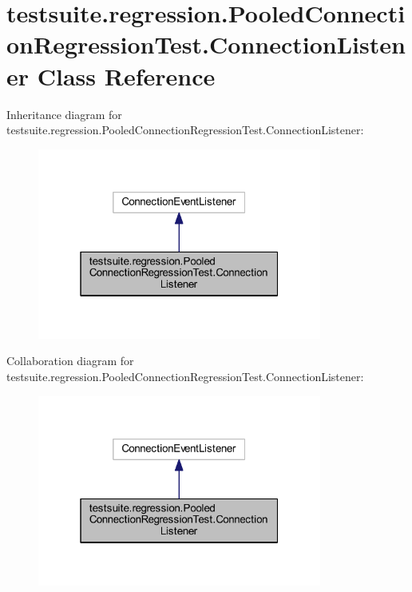 \hypertarget{classtestsuite_1_1regression_1_1_pooled_connection_regression_test_1_1_connection_listener}{}\section{testsuite.\+regression.\+Pooled\+Connection\+Regression\+Test.\+Connection\+Listener Class Reference}
\label{classtestsuite_1_1regression_1_1_pooled_connection_regression_test_1_1_connection_listener}


Inheritance diagram for testsuite.\+regression.\+Pooled\+Connection\+Regression\+Test.\+Connection\+Listener\+:
\nopagebreak
\begin{figure}[H]
\begin{center}
\leavevmode
\includegraphics[width=265pt]{classtestsuite_1_1regression_1_1_pooled_connection_regression_test_1_1_connection_listener__inherit__graph}
\end{center}
\end{figure}


Collaboration diagram for testsuite.\+regression.\+Pooled\+Connection\+Regression\+Test.\+Connection\+Listener\+:
\nopagebreak
\begin{figure}[H]
\begin{center}
\leavevmode
\includegraphics[width=265pt]{classtestsuite_1_1regression_1_1_pooled_connection_regression_test_1_1_connection_listener__coll__graph}
\end{center}
\end{figure}

